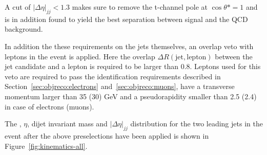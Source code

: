A cut of $|\Delta \eta|_{jj}<1.3$ makes sure to remove the t-channel pole at $\cos \theta* = 1$ and is in addition found to yield the best separation between signal and the QCD background.
%
%

In addition the these requirements on the jets themselves, an overlap veto with leptons in the event is applied. Here the overlap $\Delta R(\text{jet},\text{lepton})$ between the jet candidate and a lepton is required to be larger than 0.8. Leptons used for this veto are required to pass the identification requirements described in Section~\ref{sec:objreco:electrons} and~\ref{sec:objreco:muons}, have a transverse momentum larger than 35 (30) GeV and a pseudorapidity smaller than 2.5 (2.4) in case of electrons (muons).

The \PT, $\eta$, dijet invariant mass and $|\Delta \eta|_{jj}$ distribution for the two leading jets in the event after the above preselections have been applied is shown in Figure~\ref{fig:kinematics-all}.

